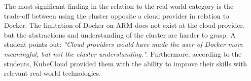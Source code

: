 \noindent
The most significant finding in the relation to the real world category is the trade-off between using the cluster opposite a cloud provider in relation to Docker. The limitation of Docker on ARM does not exist at the cloud provider, but the abstractions and understanding of the cluster are harder to grasp. A student points out: \textit{"Cloud providers would have made the user of Docker more meaningful, but not the cluster understanding."}. Furthermore, according to the students, KubeCloud provided them with the ability to improve their skills with relevant real-world technologies.



%
%
%
%
%

